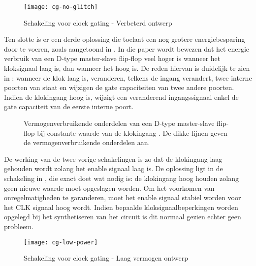 \begin{figure}[h]
	\centering
		\texttt{[image: cg-no-glitch]}
		\caption{Schakeling voor clock gating - Verbeterd ontwerp\label{figuur-implementatie-optimalisatie-cg-no-glitch}}
\end{figure}

Ten slotte is er een derde oplossing die toelaat een nog grotere energiebesparing door te voeren, zoals aangetoond in \cite{mueller}. In die paper wordt bewezen dat het energie verbruik van een D-type master-slave flip-flop veel hoger is wanneer het kloksignaal laag is, dan wanneer het hoog is. De reden hiervan is duidelijk te zien in : wanneer de klok laag is, veranderen, telkens de ingang verandert, twee interne poorten van staat en wijzigen de gate capaciteiten van twee andere poorten. Indien de klokingang hoog is, wijzigt een veranderend ingangssignaal enkel de gate capaciteit van de eerste interne poort.

\begin{figure}[h]
	\centering
		\caption[Vermogenverbruikende onderdelen van een D-type master-slave flip-flop bij constante waarde van de klok ingang]{Vermogenverbruikende onderdelen van een D-type master-slave flip-flop bij constante waarde van de klokingang \protect\cite{mueller}. De dikke lijnen geven de vermogenverbruikende onderdelen aan.\label{figuur-implementatie-optimalisatie-cg-power-dis}}
\end{figure}

De werking van de twee vorige schakelingen is zo dat de klokingang laag gehouden wordt zolang het enable signaal laag is. De oplossing ligt in de schakeling in , die exact doet wat nodig is: de klokingang hoog houden zolang geen nieuwe waarde moet opgeslagen worden. Om het voorkomen van onregelmatigheden te garanderen, moet het enable signaal stabiel worden voor het CLK signaal hoog wordt. Indien bepaalde kloksignaalbeperkingen worden opgelegd bij het synthetiseren van het circuit is dit normaal gezien echter geen probleem.

\begin{figure}[h]
	\centering
		\texttt{[image: cg-low-power]}
		\caption{Schakeling voor clock gating - Laag vermogen ontwerp\label{figuur-implementatie-optimalisatie-cg-low-power}}
\end{figure}
